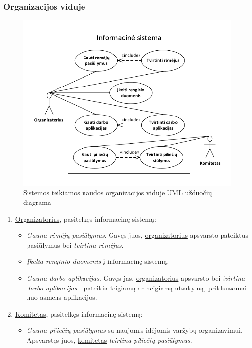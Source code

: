 \documentclass{VUMIFPSkursinis}
\begin{document}
    \subsubsection*{Organizacijos viduje}
	
	    \begin{figure}[H]
			\centering
			\includegraphics[width=\textwidth]{img/IsPSI1ScenarijausUzduociuDiagrama1}
			\caption{Sistemos teikiamos naudos organizacijos viduje UML užduočių diagrama}
			\label{fig:scenarijusVidausUzduociuDiagrama}
		\end{figure}

		\begin{enumerate}
			\item \underline{Organizatorius}, pasitelkęs informacinę sistemą:
			\begin{itemize}
				\item \textit{Gauna rėmėjų pasiūlymus}. Gavęs juos, \underline{organizatorius} apsvarsto pateiktus pasiūlymus bei  \textit{tvirtina rėmėjus}.
				\item \textit{Įkelia renginio duomenis} į informacinę sistemą.
				\item \textit{Gauna darbo aplikacijas}. Gavęs jas, \underline{organizatorius} apsvarsto bei  \textit{tvirtina darbo aplikacijas} - pateikia teigiamą ar neigiamą atsakymą, priklausomai nuo asmens aplikacijos.
			\end{itemize}
			\item \underline{Komitetas}, pasitelkęs informacinę sistemą:
			\begin{itemize}
				\item \textit{Gauna piliečių pasiūlymus} su naujomis idėjomis varžybų organizavimui. Apsvarstęs juos, \underline{komitetas} \textit{tvirtina piliečių pasiūlymus}.
			\end{itemize}
		\end{enumerate}
\end{document}
